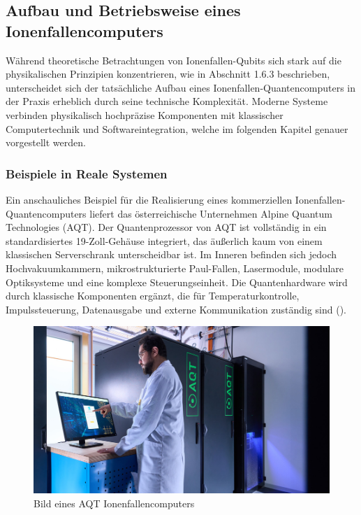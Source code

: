 \subsection{Aufbau und Betriebsweise eines Ionenfallencomputers}

Während theoretische Betrachtungen von Ionenfallen-Qubits sich stark auf die physikalischen Prinzipien konzentrieren, wie in Abschnitt 1.6.3 beschrieben, unterscheidet sich der tatsächliche Aufbau eines Ionenfallen-Quantencomputers in der Praxis erheblich durch seine technische Komplexität. Moderne Systeme verbinden physikalisch hochpräzise Komponenten mit klassischer Computertechnik und Softwareintegration, welche im folgenden Kapitel genauer vorgestellt werden.
\subsubsection{Beispiele in Reale Systemen}

Ein anschauliches Beispiel für die Realisierung eines kommerziellen Ionenfallen-Quantencomputers liefert das österreichische Unternehmen Alpine Quantum Technologies (AQT). Der Quantenprozessor von AQT ist vollständig in ein standardisiertes 19-Zoll-Gehäuse integriert, das äußerlich kaum von einem klassischen Serverschrank unterscheidbar ist. Im Inneren befinden sich jedoch Hochvakuumkammern, mikrostrukturierte Paul-Fallen, Lasermodule, modulare Optiksysteme und eine komplexe Steuerungseinheit. Die Quantenhardware wird durch klassische Komponenten ergänzt, die für Temperaturkontrolle, Impulssteuerung, Datenausgabe und externe Kommunikation zuständig sind (\cite{bischoffWettkampfQubits2024}).

    \begin{figure}[ht]
    \centering
    \includegraphics[width=1\textwidth]{images/quanten-hardware/AQT.jpg}
    \caption{Bild eines AQT Ionenfallencomputers}
    \label{fig:meinbild}
    \end{figure}

